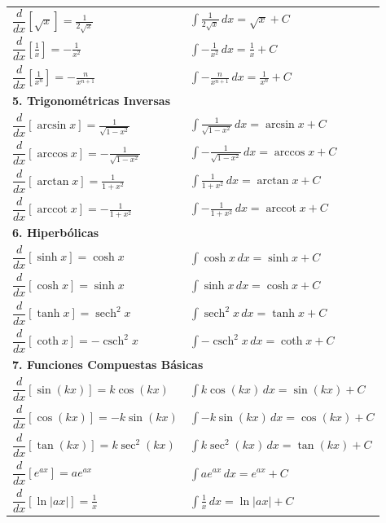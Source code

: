 \documentclass{article}
\begin{document}
\begin{center}
\begin{tabular}{|p{}|p{}|}
$\dfrac{d}{dx}[\sqrt{x}] = \frac{1}{2\sqrt{x}}$ & $\displaystyle\int \frac{1}{2\sqrt{x}} \, dx = \sqrt{x} + C$ \\
$\dfrac{d}{dx}\left[\frac{1}{x}\right] = -\frac{1}{x^2}$ & $\displaystyle\int -\frac{1}{x^2} \, dx = \frac{1}{x} + C$ \\
$\dfrac{d}{dx}\left[\frac{1}{x^n}\right] = -\frac{n}{x^{n+1}}$ & $\displaystyle\int -\frac{n}{x^{n+1}} \, dx = \frac{1}{x^n} + C$ \\
\midrule
\multicolumn{2}{|l|}{\textbf{5. Trigonométricas Inversas}} \\
\midrule
$\dfrac{d}{dx}[\arcsin x] = \frac{1}{\sqrt{1-x^2}}$ & $\displaystyle\int \frac{1}{\sqrt{1-x^2}} \, dx = \arcsin x + C$ \\
$\dfrac{d}{dx}[\arccos x] = -\frac{1}{\sqrt{1-x^2}}$ & $\displaystyle\int -\frac{1}{\sqrt{1-x^2}} \, dx = \arccos x + C$ \\
$\dfrac{d}{dx}[\arctan x] = \frac{1}{1+x^2}$ & $\displaystyle\int \frac{1}{1+x^2} \, dx = \arctan x + C$ \\
$\dfrac{d}{dx}[\operatorname{arccot} x] = -\frac{1}{1+x^2}$ & $\displaystyle\int -\frac{1}{1+x^2} \, dx = \operatorname{arccot} x + C$ \\
\midrule
\multicolumn{2}{|l|}{\textbf{6. Hiperbólicas}} \\
\midrule
$\dfrac{d}{dx}[\sinh x] = \cosh x$ & $\displaystyle\int \cosh x \, dx = \sinh x + C$ \\
$\dfrac{d}{dx}[\cosh x] = \sinh x$ & $\displaystyle\int \sinh x \, dx = \cosh x + C$ \\
$\dfrac{d}{dx}[\tanh x] = \operatorname{sech}^2 x$ & $\displaystyle\int \operatorname{sech}^2 x \, dx = \tanh x + C$ \\
$\dfrac{d}{dx}[\coth x] = -\operatorname{csch}^2 x$ & $\displaystyle\int -\operatorname{csch}^2 x \, dx = \coth x + C$ \\
\midrule
\multicolumn{2}{|l|}{\textbf{7. Funciones Compuestas Básicas}} \\
\midrule
$\dfrac{d}{dx}[\sin(kx)] = k\cos(kx)$ & $\displaystyle\int k\cos(kx) \, dx = \sin(kx) + C$ \\
$\dfrac{d}{dx}[\cos(kx)] = -k\sin(kx)$ & $\displaystyle\int -k\sin(kx) \, dx = \cos(kx) + C$ \\
$\dfrac{d}{dx}[\tan(kx)] = k\sec^2(kx)$ & $\displaystyle\int k\sec^2(kx) \, dx = \tan(kx) + C$ \\
$\dfrac{d}{dx}[e^{ax}] = ae^{ax}$ & $\displaystyle\int ae^{ax} \, dx = e^{ax} + C$ \\
$\dfrac{d}{dx}[\ln|ax|] = \frac{1}{x}$ & $\displaystyle\int \frac{1}{x} \, dx = \ln|ax| + C$ \\
\bottomrule
\end{tabular}
\end{center}
\end{document}

